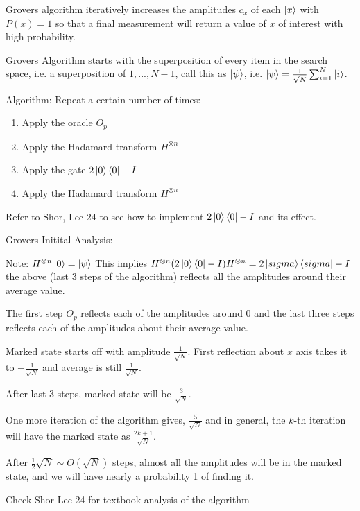 \documentclass[12pt,twoside,fleqn]{report}
\theoremstyle{thmstyle}
\begin{document}
Grovers algorithm iteratively increases the amplitudes $c_x$ of each $\ket{x}$ with $P(x) = 1$ so that a final measurement will return a value of $x$ of interest with high probability.


Grovers Algorithm starts with the superposition of every item in the search space, i.e. a superposition of $1, ..., N-1$, call this as $\ket\psi$, i.e. $\ket\psi = \frac{1}{\sqrt{N}} \sum_{i=1}^N \ket{i}$.


Algorithm:
Repeat a certain number of times:
\begin{enumerate}
    \item Apply the oracle $O_p$
    \item Apply the Hadamard transform $H^{\otimes n}$ 
    \item Apply the gate $2 \ket{0}\bra{0} - I$
    \item Apply the Hadamard transform $H^{\otimes n}$ 
\end{enumerate}

Refer to Shor, Lec 24 to see how to implement $2 \ket{0}\bra{0} - I$ and its effect. 

Grovers Initital Analysis: 

Note: $H^{\otimes n} \ket{0} = \ket{\psi}$
This implies $H^{\otimes n} (2 \ket{0}\bra{0} - I) H^{\otimes n} = 2 \ket{sigma}\bra{sigma} - I$
 the above (last 3 steps of the algorithm) reflects all the amplitudes around their average value.

The first step $O_p$ reflects each of the amplitudes around $0$ and the last three steps reflects each of the amplitudes about their average value.

Marked state starts off with amplitude $\frac{1}{\sqrt{N}}$. First reflection about $x$ axis takes it to $- \frac{1}{\sqrt{N}}$ and average is still $\frac{1}{\sqrt{N}}$.

After last 3 steps, marked state will be $\frac{3}{\sqrt{N}}$.

One more iteration of the algorithm gives, $\frac{5}{\sqrt{N}}$ and in general, the $k$-th iteration will have the marked state as $\frac{2k + 1}{\sqrt{N}}$.

After $\frac{1}{2} \sqrt{N} \sim O(\sqrt{N})$ steps, almost all the amplitudes will be in the marked state, and we will have nearly a probability 1 of finding it.


Check Shor Lec 24 for textbook analysis of the algorithm
\end{document}
